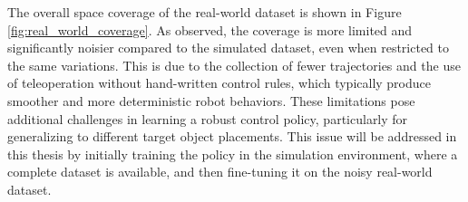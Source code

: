 The overall space coverage of the real-world dataset is shown in Figure \ref{fig:real_world_coverage}. As observed, the coverage is more limited and significantly noisier compared to the simulated dataset, even when restricted to the same variations. This is due to the collection of fewer trajectories and the use of teleoperation without hand-written control rules, which typically produce smoother and more deterministic robot behaviors. These limitations pose additional challenges in learning a robust control policy, particularly for generalizing to different target object placements. This issue will be addressed in this thesis by initially training the policy in the simulation environment, where a complete dataset is available, and then fine-tuning it on the noisy real-world dataset.

